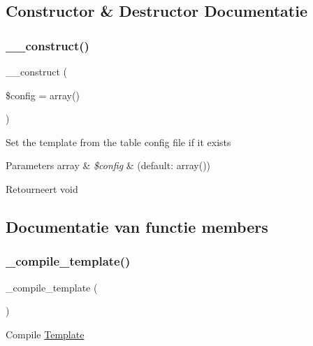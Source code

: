 \subsection{Constructor \& Destructor Documentatie}
\mbox{\label{class_c_i___table_af7f9493844d2d66e924e3c1df51ce616}} 
\subsubsection{\texorpdfstring{\_\_construct()}{\_\_construct()}}
{\footnotesize\ttfamily \+\_\+\+\_\+construct (\begin{DoxyParamCaption}\item[{}]{\$config = {\ttfamily array()} }\end{DoxyParamCaption})}

Set the template from the table config file if it exists


\begin{DoxyParams}[1]{Parameters}
array & {\em \$config} & (default\+: array()) \\
\hline
\end{DoxyParams}
\begin{DoxyReturn}{Retourneert}
void 
\end{DoxyReturn}


\subsection{Documentatie van functie members}
\mbox{\label{class_c_i___table_a7f408fd4eecadb5799d5ae004170c4d6}} 
\subsubsection{\texorpdfstring{\_compile\_template()}{\_compile\_template()}}
{\footnotesize\ttfamily \+\_\+compile\+\_\+template (\begin{DoxyParamCaption}{ }\end{DoxyParamCaption})\hspace{0.3cm}{\ttfamily [protected]}}

Compile \mbox{\hyperlink{class_template}{Template}}

